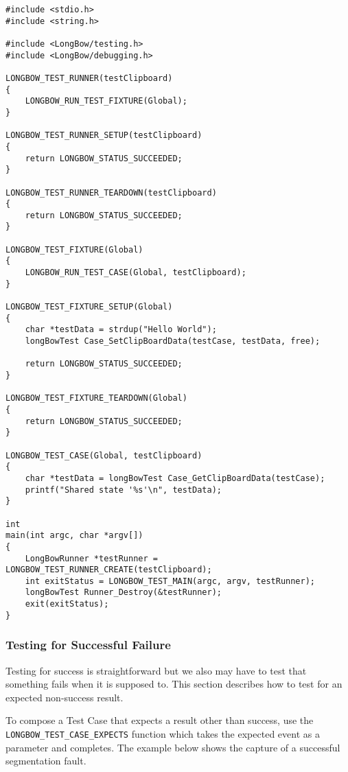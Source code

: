 \begin{lstlisting}
#include <stdio.h>
#include <string.h>

#include <LongBow/testing.h>
#include <LongBow/debugging.h>

LONGBOW_TEST_RUNNER(testClipboard)
{
    LONGBOW_RUN_TEST_FIXTURE(Global);
}

LONGBOW_TEST_RUNNER_SETUP(testClipboard)
{
    return LONGBOW_STATUS_SUCCEEDED;
}

LONGBOW_TEST_RUNNER_TEARDOWN(testClipboard)
{
    return LONGBOW_STATUS_SUCCEEDED;
}

LONGBOW_TEST_FIXTURE(Global)
{
    LONGBOW_RUN_TEST_CASE(Global, testClipboard);
}

LONGBOW_TEST_FIXTURE_SETUP(Global)
{
    char *testData = strdup("Hello World");
    longBowTest Case_SetClipBoardData(testCase, testData, free);
    
    return LONGBOW_STATUS_SUCCEEDED;
}

LONGBOW_TEST_FIXTURE_TEARDOWN(Global)
{
    return LONGBOW_STATUS_SUCCEEDED;
}

LONGBOW_TEST_CASE(Global, testClipboard)
{
    char *testData = longBowTest Case_GetClipBoardData(testCase);
    printf("Shared state '%s'\n", testData);
}

int
main(int argc, char *argv[])
{
    LongBowRunner *testRunner = LONGBOW_TEST_RUNNER_CREATE(testClipboard);
    int exitStatus = LONGBOW_TEST_MAIN(argc, argv, testRunner);
    longBowTest Runner_Destroy(&testRunner);
    exit(exitStatus);
}
\end{lstlisting}

\subsubsection {Testing for Successful Failure}
Testing for success is straightforward but we also may have to test that something fails when it is supposed to. 
This section describes how to test for an expected non-success result.

To compose a Test Case that expects a result other than success, use the {\tt LONGBOW\_TEST\_CASE\_EXPECTS} function which takes the expected event as a parameter and completes.  The example below shows the capture of a successful segmentation fault.
  

